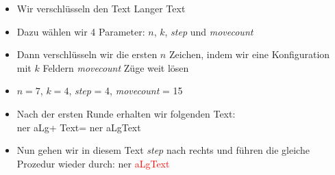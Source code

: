 \begin{frame}
        \begin{itemize}
            \item Wir verschlüsseln den Text \glqq Langer Text\grqq
            \item Dazu wählen wir 4 Parameter: $n$, $k$, \textit{step} und \textit{movecount}
            \item Dann verschlüsseln wir die ersten $n$ Zeichen, indem wir eine Konfiguration mit $k$ Feldern \textit{movecount} Züge weit lösen
        \end{itemize}
    \begin{myexample}
        \begin{itemize}
            \item $n=7$, $k=4$, \textit{step} = 4, \textit{movecount} = 15
            \item Nach der ersten Runde erhalten wir folgenden Text:\\ \glqq ner aLg\grqq + \glqq Text\grqq = \glqq ner aLgText\grqq
            \item Nun gehen wir in diesem Text \textit{step} nach rechts und führen die gleiche Prozedur wieder durch: \glqq ner \textcolor{red}{aLgText}\grqq
        \end{itemize}   
    \end{myexample}
\end{frame}